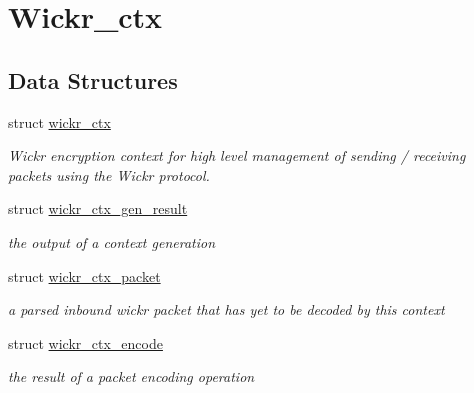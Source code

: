 \hypertarget{group__wickr__ctx}{}\section{Wickr\+\_\+ctx}
\label{group__wickr__ctx}
\subsection*{Data Structures}
\begin{DoxyCompactItemize}
\item 
struct \hyperlink{structwickr__ctx}{wickr\+\_\+ctx}
\begin{DoxyCompactList}\small\item\em Wickr encryption context for high level management of sending / receiving packets using the Wickr protocol. \end{DoxyCompactList}\item 
struct \hyperlink{structwickr__ctx__gen__result}{wickr\+\_\+ctx\+\_\+gen\+\_\+result}
\begin{DoxyCompactList}\small\item\em the output of a context generation \end{DoxyCompactList}\item 
struct \hyperlink{structwickr__ctx__packet}{wickr\+\_\+ctx\+\_\+packet}
\begin{DoxyCompactList}\small\item\em a parsed inbound wickr packet that has yet to be decoded by this context \end{DoxyCompactList}\item 
struct \hyperlink{structwickr__ctx__encode}{wickr\+\_\+ctx\+\_\+encode}
\begin{DoxyCompactList}\small\item\em the result of a packet encoding operation \end{DoxyCompactList}\end{DoxyCompactItemize}
